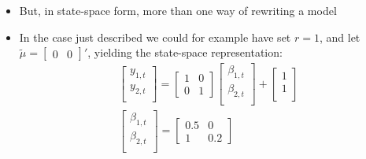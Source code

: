 \documentclass[10pt]{article}
\begin{document}
\begin{itemize}
\begin{gather*}
\begin{bmatrix}
        \end{bmatrix}
        \quad F = \begin{bmatrix}
            0.5 & 0 \\
            1 & 2
        \end{bmatrix}
        \quad Q = \begin{bmatrix}
            1 & 0.2 \\
            0.2 & 1
        \end{bmatrix}
    \end{gather*}
    $z_t = 0 \text{ and } e_t = 0\,\forall t $, i.e., no exogenous variables and no measurement errors
    \item But, in state-space form, more than one way of rewriting a model 
    \item In the case just described we could for example have set $r = 1 $, and let $\tilde{\mu} = \begin{bmatrix} 0 & 0 \end{bmatrix}' $, yielding the state-space representation: 
    \begin{gather}
        \begin{bmatrix}
            y_{1, t}\\
            y_{2, t}\\
        \end{bmatrix}
        = \begin{bmatrix}
            1 & 0 \\
            0 & 1
        \end{bmatrix}
        \begin{bmatrix}
            \beta_{1, t}\\
            \beta_{2, t }\\
        \end{bmatrix}
        +
        \begin{bmatrix}
            1\\
            1\\
        \end{bmatrix}\\
        \begin{bmatrix}
            \beta_{1, t}\\
            \beta_{2, t }\\
        \end{bmatrix}
        = 
        \begin{bmatrix}
            0.5 & 0 \\ 
            1 & 0.2
        \end{bmatrix}

\end{gather}
\end{itemize}
\end{document}
